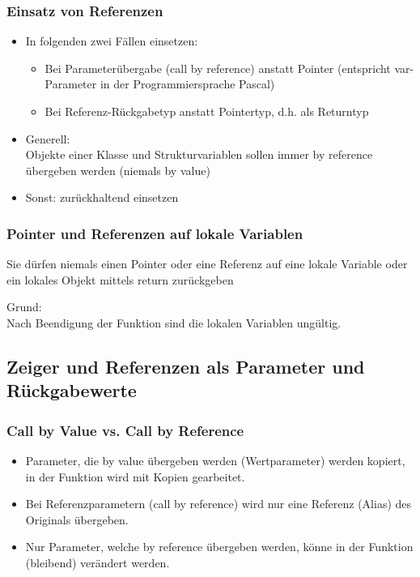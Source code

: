 \subsubsection{Einsatz von Referenzen}
\label{sec:Einsatz von Referenzen}
\begin{itemize}
	\item In folgenden zwei Fällen einsetzen:
	\begin{itemize}
		\item Bei Parameterübergabe (call by reference) anstatt Pointer (entspricht var-Parameter in der Programmiersprache Pascal)
		\item Bei Referenz-Rückgabetyp anstatt Pointertyp, d.h. als Returntyp
	\end{itemize}
	\item\Large Generell:\\Objekte einer Klasse und Strukturvariablen sollen immer by reference übergeben werden (niemals by value)\normalsize
	\item Sonst: zurückhaltend einsetzen
\end{itemize}

\subsubsection{Pointer und Referenzen auf lokale Variablen}
\label{sec:Pointer und Referenzen auf lokale Variablen}
\begin{achtung}
Sie dürfen niemals einen Pointer oder eine Referenz auf eine lokale Variable oder ein lokales Objekt mittels return zurückgeben
\end{achtung}
Grund:\\Nach Beendigung der Funktion sind die lokalen Variablen ungültig.


\subsection{Zeiger und Referenzen als Parameter und Rückgabewerte}
\label{sec:Zeiger und Referenzen als Parameter und Rueckgabewerte}

\subsubsection{Call by Value vs. Call by Reference}
\label{sec:Call by Value vs. Call by Reference}
\begin{itemize}
	\item Parameter, die by value übergeben werden (Wertparameter) werden kopiert, in der Funktion wird mit Kopien gearbeitet.
	\item Bei Referenzparametern (call by reference) wird nur eine Referenz (Alias) des Originals übergeben.
	\item Nur Parameter, welche by reference übergeben werden, könne in der Funktion (bleibend) verändert werden.
\end{itemize}


